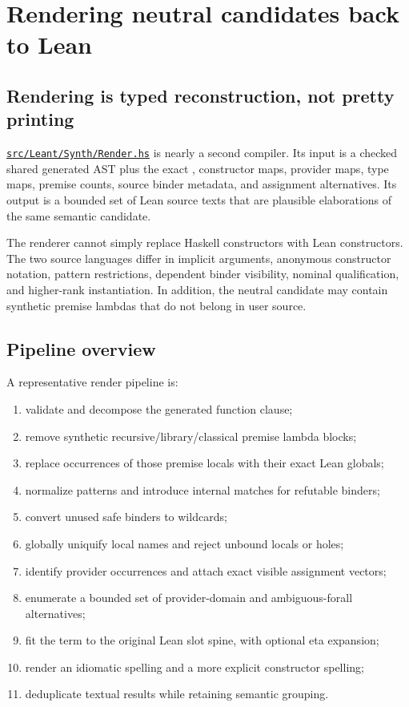 \documentclass[10pt,letterpaper,oneside]{report}
\newcommand{\code}[1]{\texttt{\detokenize{#1}}}
\def\LeantBase{https://github.com/VladimirReshetnikov/Leant/blob/ada69d884480b93e74ee4b3daf77be38702ee07d/}
\newcommand{\lpath}[1]{\href{\LeantBase#1}{\nolinkurl{#1}}}
\begin{document}
\chapter{Rendering neutral candidates back to Lean}\label{ch:render-verify}

\section{Rendering is typed reconstruction, not pretty printing}

\lpath{src/Leant/Synth/Render.hs} is nearly a second compiler. Its input is a checked shared generated AST plus the exact \code{Frag}, constructor maps, provider maps, type maps, premise counts, source binder metadata, and assignment alternatives. Its output is a bounded set of Lean source texts that are plausible elaborations of the same semantic candidate.

The renderer cannot simply replace Haskell constructors with Lean constructors. The two source languages differ in implicit arguments, anonymous constructor notation, pattern restrictions, dependent binder visibility, nominal qualification, and higher-rank instantiation. In addition, the neutral candidate may contain synthetic premise lambdas that do not belong in user source.

\section{Pipeline overview}

A representative render pipeline is:

\begin{enumerate}
  \item validate and decompose the generated function clause;
  \item remove synthetic recursive/library/classical premise lambda blocks;
  \item replace occurrences of those premise locals with their exact Lean globals;
  \item normalize patterns and introduce internal matches for refutable binders;
  \item convert unused safe binders to wildcards;
  \item globally uniquify local names and reject unbound locals or holes;
  \item identify provider occurrences and attach exact visible assignment vectors;
  \item enumerate a bounded set of provider-domain and ambiguous-forall alternatives;
  \item fit the term to the original Lean slot spine, with optional eta expansion;
  \item render an idiomatic spelling and a more explicit constructor spelling;
  \item deduplicate textual results while retaining semantic grouping.
\end{enumerate}
\end{document}
